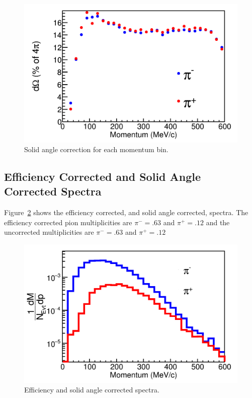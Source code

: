 \documentclass[12pt, letterpaper, twoside]{article}
\begin{document}
\begin{figure}[!hbt]
\includegraphics[width=\textwidth]{omega.png}
 \caption{Solid angle correction for each momentum bin.}
 \label{fig:solid}
\end{figure}
 
 
 \subsection{Efficiency Corrected and Solid Angle Corrected Spectra}
 Figure~\ref{fig:spectra} shows the efficiency corrected, and solid angle corrected, spectra. The efficiency corrected pion multiplicities are $\pi^- = .63$ and $\pi^+ = .12$ and the uncorrected multiplicities are $\pi^- = .63$ and $\pi^+ = .12$
 
\begin{figure}[!hbt]
\includegraphics[width=\textwidth]{spectra.png}
\caption{Efficiency and solid angle corrected spectra.}
\label{fig:spectra}
\end{figure}
 
\end{document}
